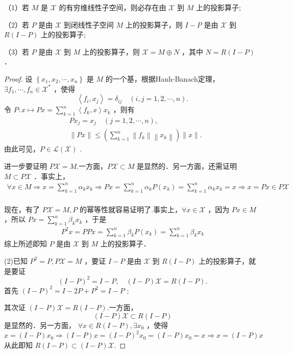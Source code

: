 \documentclass[lang=cn,newtx,10pt,scheme=chinese,thmcnt=chapter]{elegantbook}
\begin{document}
\begin{problemset}
（1）若 $M$ 是 $\mathcal{X}$ 的有穷维线性子空间，则必存在由 $\mathcal{X}$ 到 $M$ 上的投影算子;

（2）若 $P$ 是由 $\mathcal{X}$ 到闭线性子空间 $M$ 上的投影算子，则 $I-P$ 是由 $\mathcal{X}$ 到 $R(I-P)$ 上的投影算子;

（3）若 $P$ 是由 $\mathcal{X}$ 到 $M$ 上的投影算子，则 $\mathcal{X}=M \oplus N$ ，其中 $N= R(I-P)$ ．\begin{proof}
    设 $\left\{x_1, x_2, \cdots, x_n\right\}$ 是 $M$ 的一个基，根据Hanh-Banach定理， $\exists f_1, \cdots, f_n \in \mathcal{X}^*$ ，使得
$$
\left\langle f_i, x_j\right\rangle=\delta_{i j} \quad(i, j=1,2, \cdots, n) .
$$
令 $P: x \mapsto P x=\sum_{k=1}^n\left\langle f_k, x\right\rangle x_k$ ，则有
$$
\begin{aligned}
& P x_j=x_j \quad(j=1,2, \cdots, n), \\
& \|P x\| \leqslant\left(\sum_{k=1}^n\left\|f_k\right\|\left\|x_k\right\|\right)\|x\| .
\end{aligned}
$$
由此可见，$P \in \mathcal{L}(\mathcal{X})$ .

进一步要证明 $P \mathcal{X}=M$.一方面，$P \mathcal{X} \subset M$ 是显然的．另一方面，还需证明 $M \subset P \mathcal{X}$ ．事实上，
$$
\begin{aligned}
 \forall x \in M  \Rightarrow x=\sum_{k=1}^n \alpha_k x_k \Rightarrow P x=\sum_{k=1}^n \alpha_k P\left(x_k\right)=\sum_{k=1}^n \alpha_k x_k=x\Rightarrow x=P x \in P \mathcal{X} \\
\end{aligned}
$$

现在，有了 $P \mathcal{X}=M, P$ 的幂等性就容易证明了.事实上，$\forall x \in \mathcal{X}$ ，因为 $P x \in M$ ，所以 $P x=\sum_{k=1}^n \beta_k x_k$ ，于是
$$
\begin{gathered}
P^2 x =
P P x=\sum_{k=1}^n \beta_k P\left(x_k\right)=\sum_{k=1}^n \beta_k x_k
\end{gathered}
$$
综上所述即知 $P$ 是由 $\mathcal{X}$ 到 $M$ 上的投影算子．

(2)已知 $P^2=P, P \mathcal{X}=M$ ，要证 $I-P$ 是由 $\mathcal{X}$ 到 $R(I-P)$ 上的投影算子，就是要证
$$
(I-P)^2=I-P, \quad(I-P) \mathcal{X}=R(I-P) .
$$
  首先 $(I-P)^2=I-2 P+P^2 = I-P$ ;
  
其次证 $(I-P) \mathcal{X}=R(I-P)$.一方面，
$$
(I-P) \mathcal{X} \subset R(I-P)
$$
是显然的．另一方面，
$\forall x \in R(I-P),\exists x_0$ ，使得 $x=(I-P) x_0 \Longrightarrow(I-P) x=(I-P)^2 x_0=(I-P) x_0=x\Rightarrow x=(I-P) x$从此即知 $R(I-P) \subset(I-P) \mathcal{X}$.


\end{proof}
\end{problemset}
\end{document}
